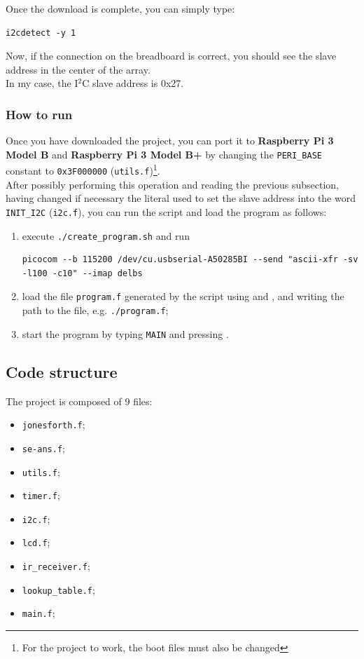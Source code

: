 \documentclass[a4paper, 12pt]{article}
\begin{document}
Once the download is complete, you can simply type:
\begin{Verbatim}[breaklines=true, breakanywhere=true]
    i2cdetect -y 1 
\end{Verbatim}
Now, if the connection on the breadboard is correct, you should see the slave address in the center of the array. \\
In my case, the I$^2$C slave address is 0x27.

\subsubsection{How to run}

Once you have downloaded the project, you can port it to \textbf{Raspberry Pi 3 Model B} and \textbf{Raspberry Pi 3 Model B+} by changing the \texttt{PERI\_BASE} constant to \texttt{0x3F000000} (\texttt{utils.f})\footnote{For the project to work, the boot files must also be changed}. \\
After possibly performing this operation and reading the previous subsection, having changed if necessary the literal used to set the slave address into the word \texttt{INIT\_I2C} (\texttt{i2c.f}), you can run the script and load the program as follows:
\begin{enumerate}
    \item execute \texttt{./create\_program.sh} and run 
        \begin{Verbatim}[breaklines=true, breakanywhere=true]
        picocom --b 115200 /dev/cu.usbserial-A50285BI --send "ascii-xfr -sv -l100 -c10" --imap delbs
        \end{Verbatim}
    \item load the file \texttt{program.f} generated by the script using  and , and writing the path to the file, e.g. \texttt{./program.f};
    \item start the program by typing \texttt{MAIN} and pressing \keys{\return}.
\end{enumerate}

\subsection{Code structure}

The project is composed of 9 files:
\begin{itemize}
    \item \texttt{jonesforth.f};
    \item \texttt{se-ans.f};
    \item \texttt{utils.f};
    \item \texttt{timer.f};
    \item \texttt{i2c.f};
    \item \texttt{lcd.f};
    \item \texttt{ir\_receiver.f};
    \item \texttt{lookup\_table.f};
    \item \texttt{main.f};
\end{itemize}
\end{document}
